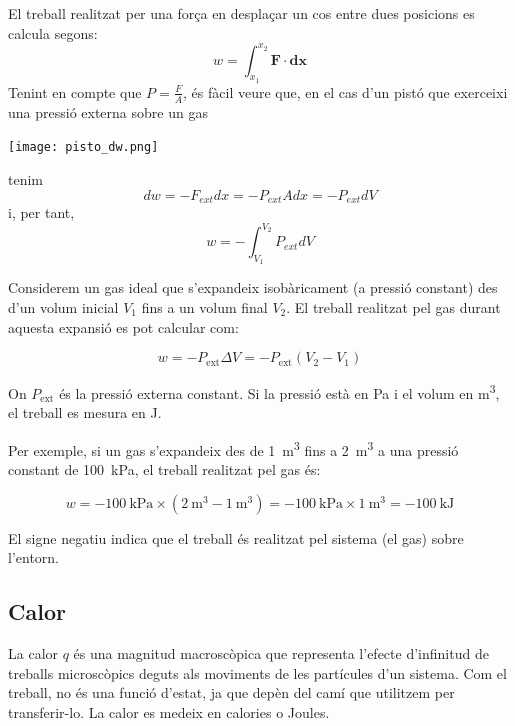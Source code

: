 El treball realitzat per una força en desplaçar un cos entre dues posicions es calcula segons:
\[
w=\int_{x_1}^{x_2} \mathbf{F} \cdot \mathbf{dx}
\]
Tenint en compte que $P=\frac{F}{A}$, és fàcil veure que, en el cas d'un pistó que exerceixi una pressió externa sobre un gas 
\begin{center}
\texttt{[image: pisto\_dw.png]}
\end{center}
tenim
\[
dw=-F_{ext}dx = -P_{ext} A dx = -P_{ext} dV
\]
i, per tant,
\[
w=-\int_{V_1}^{V_2} P_{ext} dV
\]
\begin{EXMP}

Considerem un gas ideal que s'expandeix isobàricament (a pressió constant) des d'un volum inicial $V_1$ fins a un volum final $V_2$. El treball realitzat pel gas durant aquesta expansió es pot calcular com:

\[
w = -P_{\text{ext}} \Delta V = -P_{\text{ext}} (V_2 - V_1)
\]

On $P_{\text{ext}}$ és la pressió externa constant. Si la pressió està en \si{\pascal} i el volum en \si{\meter\cubed}, el treball es mesura en \si{\joule}.

Per exemple, si un gas s'expandeix des de \qty{1}{\meter\cubed} fins a \qty{2}{\meter\cubed} a una pressió constant de \qty{100}{\kilo\pascal}, el treball realitzat pel gas és:

\[
w = -\qty{100}{\kilo\pascal} \times (\qty{2}{\meter\cubed} - \qty{1}{\meter\cubed}) = -\qty{100}{\kilo\pascal} \times \qty{1}{\meter\cubed} = -\qty{100}{\kilo\joule}
\]

El signe negatiu indica que el treball és realitzat pel sistema (el gas) sobre l'entorn.
\end{EXMP}



\subsection{Calor}

La calor $q$ és una magnitud macroscòpica que representa l'efecte d'infinitud de treballs microscòpics deguts als moviments de les partícules d'un sistema.
Com el treball, no és una funció d'estat, ja que depèn del camí que utilitzem per transferir-lo.
La calor es medeix en calories o Joules.

